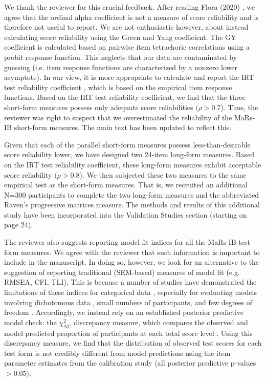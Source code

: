 \documentclass[a4paper,notitlepage,12pt]{article}
\begin{document}
We thank the reviewer for this crucial feedback. After reading Flora (2020) \cite{flora2020your}, we agree that the ordinal alpha coefficient is not a measure of score reliability and is therefore not useful to report. We are not enthusiastic however, about instead calculating score reliability using the Green and Yang coefficient. The GY coefficient is calculated based on pairwise item tetrachoric correlations using a probit response function. This neglects that our data are contaminated by guessing (i.e. item response functions are characterized by a nonzero lower asymptote). In our view, it is more appropriate to calculate and report the IRT test reliability coefficient \cite{kim2010estimation, nicewander2018conditional}, which is based on the empirical item response functions. Based on the IRT test reliability coefficient, we find that the three short-form measures possess only adequate score reliabilities $(\rho > 0.7$). Thus, the reviewer was right to suspect that we overestimated the reliability of the MaRs-IB short-form measures. The main text has been updated to reflect this. 

Given that each of the parallel short-form measures possess less-than-desirable score reliability lower, we have designed two 24-item long-form measures. Based on the IRT test reliability coefficient, these long-form measures exhibit acceptable score reliability $(\rho > 0.8$). We then subjected these two measures to the same empirical test as the short-form measures. That is, we recruited an additional N=300 participants to complete the two long-form measures and the abbreviated Raven's progressive matrices measure. The methods and results of this additional study have been incorporated into the Validation Studies section (starting on page 24).

The reviewer also suggests reporting model fit indices for all the MaRs-IB test form measures. We agree with the reviewer that such information is important to include in the manuscript. In doing so, however, we look for an alternative to the suggestion of reporting traditional (SEM-based) measures of model fit (e.g. RMSEA, CFI, TLI). This is because a number of studies have demonstrated the limitations of these indices for categorical data \cite{reise2014evaluating}, especially for evaluating models involving dichotomous data \cite{clark2018model}, small numbers of participants, and few degrees of freedom \cite{kenny2015performance}. Accordingly, we instead rely on an established posterior predictive model check: the $\chi^2_{NC}$ discrepancy measure, which compares the observed and model-predicted proportion of participants at each total score level  \cite{sinharay2006posterior}. Using this discrepancy measure, we find that the distribution of observed test scores for each test form is not credibly different from model predictions using the item parameter estimates from the calibration study (all posterior predictive p-values $> 0.05$). 
\end{document}
